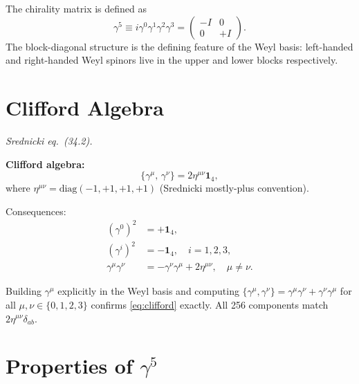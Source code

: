 The chirality matrix is defined as
\begin{equation}\label{eq:gamma5-def}
  \gamma^5 \equiv i\gamma^0\gamma^1\gamma^2\gamma^3
  = \begin{pmatrix}-I&0\\0&+I\end{pmatrix}.
\end{equation}
The block-diagonal structure is the defining feature of the Weyl basis: left-handed
and right-handed Weyl spinors live in the upper and lower blocks respectively.

\section{Clifford Algebra}

\textit{Srednicki eq.\ (34.2).}

\begin{mdframed}[backgroundcolor=blue!5]
\textbf{Clifford algebra:}
\begin{equation}\label{eq:clifford}
  \{\gamma^\mu,\, \gamma^\nu\} = 2\eta^{\mu\nu}\mathbf{1}_4,
\end{equation}
where $\eta^{\mu\nu} = \mathrm{diag}(-1,+1,+1,+1)$ (Srednicki mostly-plus convention).
\end{mdframed}

Consequences:
\begin{align}
  (\gamma^0)^2 &= +\mathbf{1}_4, \\
  (\gamma^i)^2 &= -\mathbf{1}_4, \quad i=1,2,3, \\
  \gamma^\mu\gamma^\nu &= -\gamma^\nu\gamma^\mu + 2\eta^{\mu\nu}, \quad \mu\neq\nu.
\end{align}

\begin{mdframed}[backgroundcolor=green!5]
 Building $\gamma^\mu$ explicitly in the Weyl basis and
computing $\{\gamma^\mu,\gamma^\nu\} = \gamma^\mu\gamma^\nu + \gamma^\nu\gamma^\mu$
for all $\mu,\nu\in\{0,1,2,3\}$ confirms \eqref{eq:clifford} exactly.
All 256 components match $2\eta^{\mu\nu}\delta_{ab}$.
\end{mdframed}

\section{Properties of $\gamma^5$}

